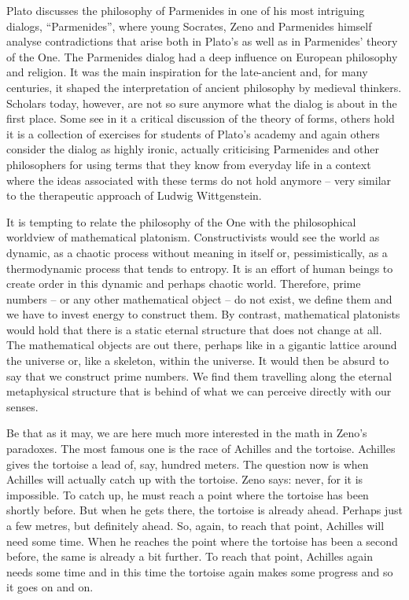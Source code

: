 \documentclass[tikz]{scrreprt}
\begin{document}
Plato discusses the philosophy of Parmenides in one
of his most intriguing dialogs, ``Parmenides'', 
where young Socrates, Zeno and Parmenides himself
analyse contradictions that arise both in Plato's
 as well as in Parmenides' theory of the One.
The Parmenides dialog had a deep influence on 
European philosophy and religion. 
It was the main inspiration for the late-ancient
 and, for many centuries,
it shaped the interpretation of ancient philosophy
by medieval thinkers.
Scholars today, however, are not so sure anymore
what the dialog is about in the first place.
Some see in it a critical discussion of 
the theory of forms, others hold it is a collection
of exercises for students of Plato's academy
and again others consider the dialog as highly ironic,
actually criticising Parmenides and other philosophers
for using terms that they know from everyday life 
in a context where the ideas associated with these terms
do not hold anymore -- very similar to the therapeutic
approach of Ludwig Wittgenstein.

It is tempting to relate the philosophy of the One with the
philosophical worldview of mathematical platonism.
Constructivists would see the world as dynamic,
as a chaotic process without meaning in itself or,
pessimistically, as a thermodynamic process that tends to entropy.
It is an effort of human beings to create order in this
dynamic and perhaps chaotic world.
Therefore, prime numbers -- or any other mathematical object --
do not exist, we define them and we have to
invest energy to construct them.
By contrast, mathematical platonists would hold that there
is a static eternal structure that does not change at all.
The mathematical objects are out there, perhaps like in
a gigantic lattice around the universe or, like a skeleton,
within the universe.
It would then be absurd to say that we construct prime numbers.
We find them travelling along the eternal metaphysical structure
that is behind of what we can perceive directly with our senses.

Be that as it may,
we are here much more interested in the math
in Zeno's paradoxes.
The most famous one is the race
of Achilles and the tortoise.
Achilles gives the tortoise a lead of, say, hundred meters.
The question now is when Achilles will actually catch up with
the tortoise. Zeno says: never, for it is impossible.
To catch up, he must reach a point where the tortoise has been
shortly before. But when he gets there, the tortoise is already
ahead. Perhaps just a few metres, but definitely ahead.
So, again, to reach that point, Achilles will need some time.
When he reaches the point where the tortoise has been a second before,
the same is already a bit further. 
To reach that point, Achilles again needs some time
and in this time the tortoise again makes some progress
and so it goes on and on. 
\end{document}
